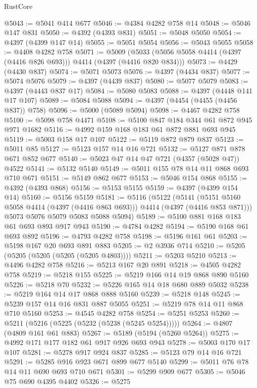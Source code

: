 \begin{lexlean}{RustCore}
\begin{coremodule}
@5043 := @5041 @414 @677
@5046 := @4384 @4282 @758 @14
@5048 := @5046 @147 @831
@5050 := @4392 (@4393 @831)
@5051 := @5048 @5050
@5054 := @4397 (@4399 @147 @14)
@5055 := @5051 @5054
@5056 := @5043 @5055
@5058 := @4408 @4282 @758
@5071 := @5009 (@5033 (@5056 @5058 @4414 (@4397 (@4416 @826 @693))) @4414 (@4397 (@4416 @820 @834)))
@5073 := @4429 (@4430 @837)
@5074 := @5071 @5073
@5076 := @4397 (@4434 @837)
@5077 := @5074 @5076
@5079 := @4397 (@4439 @837)
@5080 := @5077 @5079
@5083 := @4397 (@4443 @837 @17)
@5084 := @5080 @5083
@5088 := @4397 (@4448 @141 @17 @107)
@5089 := @5084 @5088
@5094 := @4397 (@4454 (@4455 (@4456 @837)) @758)
@5096 := @5000 (@5089 @5094)
@5098 := @4467 @4282 @758
@5100 := @5098 @758 @4471
@5108 := @5100 @847 @184 @344 @61 @872 @945 @971 @1682
@5116 := @4992 @159 @168 @183 @61 @872 @881 @693 @945
@5119 := @5003 @158 @17 @107
@5122 := @5119 @872 @879 @837
@5123 := @5011 @85
@5127 := @5123 @157 @14 @16 @721
@5132 := @5127 @871 @878 @671 @852 @677
@5140 := @5023 @47 @14 @47 @721 (@4357 (@5028 @47)) @4522
@5141 := @5132 @5140
@5149 := @5011 @155 @78 @14 @11 @868 @693 @710 @671
@5151 := @5149 @862 @677
@5153 := @5046 @154 @868
@5155 := @4392 (@4393 @868)
@5156 := @5153 @5155
@5159 := @4397 (@4399 @154 @14)
@5160 := @5156 @5159
@5181 := @5116
    (@5122
      (@5141 (@5151 @5160 @5058 @4414 (@4397 (@4416 @863 @693))) @4414 (@4397 (@4416 @853 @871)))
      @5073
      @5076
      @5079
      @5083
      @5088
      @5094)
@5189 := @5100 @881 @168 @183 @61 @693 @893 @917 @943
@5190 := @4784 @4282
@5194 := @5190 @168 @61 @693 @892
@5196 := @4793 @4282 @758
@5198 := @5196 @161 @61
@5203 := @5198 @167 @20 @693 @891 @883
@5205 := @2 @3936 @714
@5210 := @5205 (@5205 (@5205 (@5205 (@5205 @4803))))
@5211 := @5203 @5210
@5213 := @4496 @4282 @758
@5216 := @5213 @167 @20 @891
@5218 := @4505 @4282 @758
@5219 := @5218 @155
@5225 := @5219 @166 @14 @19 @868 @890 @5160
@5226 := @5218 @70
@5232 := @5226 @165 @14 @18 @680 @889 @5032
@5238 := @5219 @164 @14 @17 @868 @888 @5160
@5239 := @5218 @148
@5245 := @5239 @157 @14 @16 @831 @887 @5055
@5251 := @5219 @78 @14 @11 @868 @710 @5160
@5253 := @4545 @4282 @758
@5254 := @5251 @5253
@5260 := @5211 (@5216 (@5225 (@5232 (@5238 (@5245 @5254)))))
@5264 := @4807 (@4809 @161 @61 @883)
@5267 := @5189 (@5194 (@5260 @5264))
@5275 := @4992 @171 @177 @182 @61 @917 @926 @693 @943
@5278 := @5003 @170 @17 @107
@5281 := @5278 @917 @924 @837
@5285 := @5123 @79 @14 @16 @721
@5291 := @5285 @916 @923 @671 @899 @677 @5140
@5299 := @5011 @76 @78 @14 @11 @690 @693 @710 @671
@5301 := @5299 @909 @677
@5305 := @5046 @75 @690 @4395 @4402
@5326 := @5275

\end{coremodule}
\end{lexlean}
